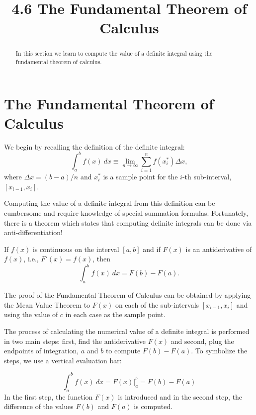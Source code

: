 \documentclass[handout]{ximera}
\title{4.6 The Fundamental Theorem of Calculus}
\begin{document}
\begin{abstract}
In this section we learn to compute the value of a definite integral using the fundamental theorem of calculus.
\end{abstract}

\maketitle



\section{The Fundamental Theorem of Calculus}

We begin by recalling the definition of the definite integral:
\[
\int_a^b f(x) \ dx \equiv \lim_{n\to \infty} \sum_{i=1}^n f(x_i^*)\Delta x,
\]
where $\Delta x = (b-a)/n$ and $x_i^*$ is a sample point for the $i$-th sub-interval, $[x_{i-1}, x_i]$.


Computing the value of a definite integral from this definition can be cumbersome and 
require knowledge of special summation formulas.  Fortunately, there is a theorem which states 
that computing definite integrals can be done via anti-differentiation!


\begin{theorem}
If $f(x)$ is continuous on the interval $[a, b]$ and if $F(x)$ is an 
antiderivative of $f(x)$, i.e., $F'(x) = f(x)$, then
\[
\int_a^b f(x) \ dx = F(b) - F(a).
\]
\end{theorem}


The proof of the Fundamental Theorem of Calculus can be obtained by applying the Mean Value Theorem 
to $F(x)$ on each of the sub-intervals $[x_{i-1}, x_i]$
and using the value of $c$ in each case as the sample point.


The process of calculating the numerical value of a definite integral is performed in 
two main steps: first, find the antiderivative
$F(x)$ and  second, plug the endpoints of integration, $a$ and $b$ to compute $F(b) - F(a)$. 
To symbolize the steps, we use a vertical evaluation bar:

\[\int_a^b f(x) \ dx = F(x)\Big|_a^b = F(b) - F(a)\]
In the first step, the function $F(x)$ is introduced and in the second step, the difference 
of the values $F(b)$ and $F(a)$ is computed.
\end{document}
